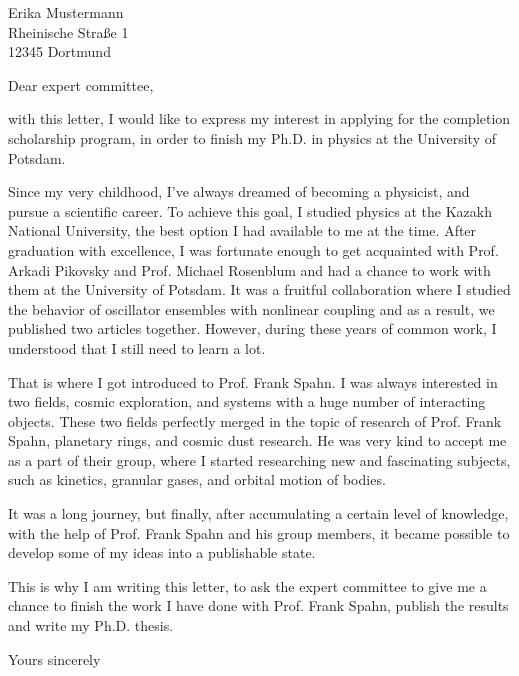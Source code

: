 \documentclass[version=last, Briefvorlage]{scrlttr2}
\begin{document}
%
\begin{letter}{%
		Erika Mustermann\\
		Rheinische Straße 1\\
		12345 Dortmund%
	}
	\opening{Dear expert committee,}

with this letter, I would like to express my interest in applying for the completion scholarship program, in order
to finish my Ph.D. in physics at the University of Potsdam.

Since my very childhood, I’ve always dreamed of becoming a physicist, and pursue a scientific career.
To achieve this goal, I studied physics at the Kazakh National University,
the best option I had available to me at the time. After graduation with excellence, 
I was fortunate enough to get acquainted with Prof. Arkadi Pikovsky and Prof. Michael Rosenblum and 
had a chance to work with them at the University of Potsdam.
It was a fruitful collaboration where I studied the behavior of oscillator ensembles with nonlinear 
coupling and as a result, we published two articles together. However, during these years of common work, 
I understood that I still need to learn a lot.


That is where I got introduced to Prof. Frank Spahn. I was always interested in two fields, 
cosmic exploration, and systems with a huge number of interacting objects. 
These two fields perfectly merged in the topic of research of Prof. Frank Spahn,
planetary rings, and cosmic dust research. He was very kind to accept me as a part of their group, 
where I started researching new and fascinating subjects, such as kinetics, granular gases, and orbital motion of bodies.

It was a long journey, but finally, after accumulating a certain level of knowledge, with the help of 
Prof. Frank Spahn and his group members, it became possible to develop some of my ideas into a publishable state. 


This is why I am writing this letter, to ask the expert committee to give me a chance to finish the work 
I have done with Prof. Frank Spahn, publish the results and write my Ph.D. thesis.

	\closing{Yours sincerely}    
\end{letter}
%
\end{document}
